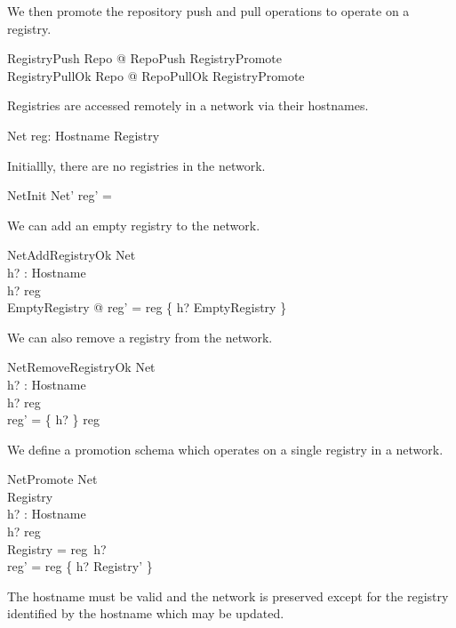 \documentclass[a4paper,twoside,12pt]{article}
\begin{document}
We then promote the repository push and pull operations to operate on a registry.
\begin{zed}
  RegistryPush  \exists \Delta Repo @ RepoPush \land RegistryPromote \\
  RegistryPullOk  \exists \Delta Repo @ RepoPullOk \land RegistryPromote \\
\end{zed}
  
Registries are accessed remotely in a network via their hostnames.
\begin{schema}{Net}
    reg: Hostname \pfun Registry \\
\end{schema}

Initiallly, there are no registries in the network.
\begin{schema}{NetInit}
  Net'
\where
  reg' = \emptyset
\end{schema}

We can add an empty registry to the network.
\begin{schema}{NetAddRegistryOk}
  \Delta Net \\
  h? : Hostname \\
\where
  h? \notin \dom reg \\
  \exists EmptyRegistry @ reg' = reg \cup \{ h? \mapsto \theta EmptyRegistry \} \\
\end{schema}

We can also remove a registry from the network.
\begin{schema}{NetRemoveRegistryOk}
  \Delta Net \\
  h? : Hostname \\
\where
  h? \in \dom reg \\
  reg' = \{ h? \} \ndres reg \\
\end{schema}

We define a promotion schema which operates on a single registry in a network.
\begin{schema}{NetPromote}
  \Delta Net \\
  \Delta Registry \\
  h? : Hostname \\
\where
  h? \in \dom reg \\
  \theta Registry = reg~h? \\
  reg' = reg \oplus \{ h? \mapsto \theta Registry' \} \\
\end{schema}
The hostname must be valid and the network is preserved except for the registry identified by the hostname which may be updated.
\end{document}
